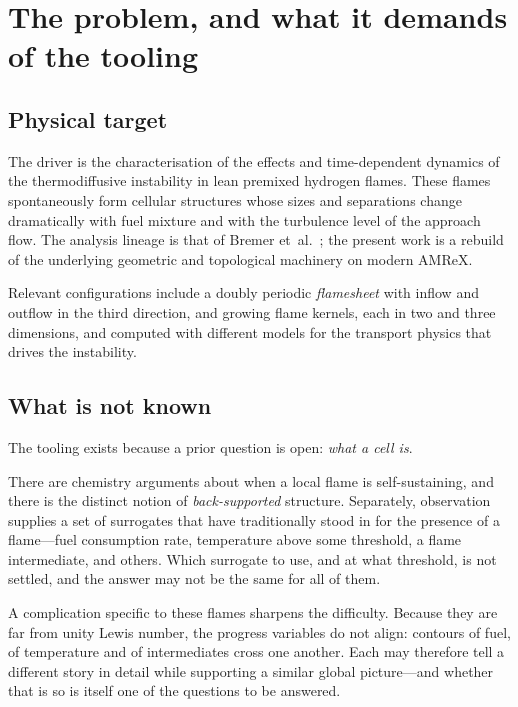 \chapter{The problem, and what it demands of the tooling}
\label{ch:problem}

\section{Physical target}

The driver is the characterisation of the effects and time-dependent dynamics
of the thermodiffusive instability in lean premixed hydrogen flames. These
flames spontaneously form cellular structures whose sizes and separations
change dramatically with fuel mixture and with the turbulence level of the
approach flow. The analysis lineage is that of Bremer
et~al.~\cite{bremer2010burning}; the present work is a rebuild of the
underlying geometric and topological machinery on modern AMReX.

Relevant configurations include a doubly periodic \emph{flamesheet} with inflow
and outflow in the third direction, and growing flame kernels, each in two and
three dimensions, and computed with different models for the transport physics
that drives the instability.

\section{What is not known}

The tooling exists because a prior question is open: \emph{what a cell is}.

There are chemistry arguments about when a local flame is self-sustaining, and
there is the distinct notion of \emph{back-supported} structure. Separately,
observation supplies a set of surrogates that have traditionally stood in for
the presence of a flame---fuel consumption rate, temperature above some
threshold, a flame intermediate, and others. Which surrogate to use, and at
what threshold, is not settled, and the answer may not be the same for all of
them.

A complication specific to these flames sharpens the difficulty. Because they
are far from unity Lewis number, the progress variables do not align: contours
of fuel, of temperature and of intermediates cross one another. Each may
therefore tell a different story in detail while supporting a similar global
picture---and whether that is so is itself one of the questions to be answered.

